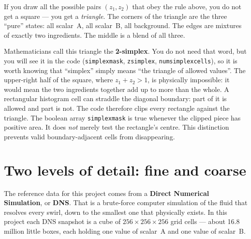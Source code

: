 \documentclass[11pt,a4paper]{report}
\newcommand{\code}[1]{\texttt{#1}}
\newcommand{\term}[1]{\textbf{#1}}
\renewcommand{\_}{\origtextunderscore\allowbreak}
\begin{document}
If you draw all the possible pairs $(z_1, z_2)$ that obey the rule above, you do not get a
square --- you get a \emph{triangle}. The corners of the triangle are the three ``pure''
states: all scalar~A, all scalar~B, all background. The edges are mixtures of exactly two
ingredients. The middle is a blend of all three.

\begin{center}
\end{center}

\noindent
Mathematicians call this triangle the \term{2-simplex}. You do not need that word, but you
will see it in the code (\code{simplex\_mask}, \code{z\_simplex}, \code{num\_simplex\_cells}),
so it is worth knowing that ``simplex'' simply means ``the triangle of allowed values''.
The upper-right half of the square, where $z_1 + z_2 > 1$, is physically impossible: it
would mean the two ingredients together add up to more than the whole. A rectangular
histogram cell can straddle the diagonal boundary: part of it is allowed and part is not.
The code therefore clips every rectangle against the triangle.  The boolean array
\code{simplex\_mask} is true whenever the clipped piece has positive area.  It does
\emph{not} merely test the rectangle's centre.  This distinction prevents valid
boundary-adjacent cells from disappearing.

\section{Two levels of detail: fine and coarse}

The reference data for this project comes from a \term{Direct Numerical Simulation}, or
\term{DNS}. That is a brute-force computer simulation of the fluid that resolves every
swirl, down to the smallest one that physically exists. In this project each DNS snapshot
is a cube of $256 \times 256 \times 256$ grid cells --- about 16.8 million little boxes,
each holding one value of scalar~A and one value of scalar~B.
\end{document}
